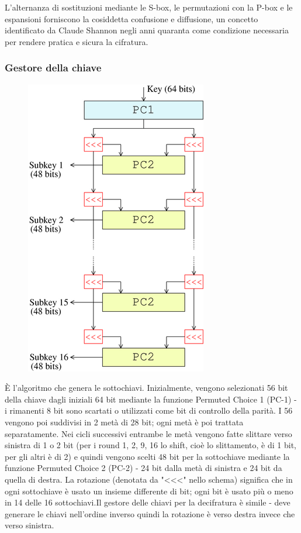 \documentclass[10pt,a4paper]{article}
\begin{document}
L'alternanza di sostituzioni mediante le S-box, le permutazioni con la P-box e le espansioni forniscono la cosiddetta confusione e diffusione, un concetto identificato da Claude Shannon negli anni quaranta come condizione necessaria per rendere pratica e sicura la cifratura.

\subsubsection{Gestore della chiave}

\begin{figure}[htbp]
\includegraphics[scale=0.6]{immagini/DES_gestore_chiave.png}
\end{figure}
È l'algoritmo che genera le sottochiavi. Inizialmente, vengono selezionati 56 bit della chiave dagli iniziali 64 bit mediante la funzione Permuted Choice 1 (PC-1) - i rimanenti 8 bit sono scartati o utilizzati come bit di controllo della parità. I 56 vengono poi suddivisi in 2 metà di 28 bit; ogni metà è poi trattata separatamente. Nei cicli successivi entrambe le metà vengono fatte slittare verso sinistra di 1 o 2 bit (per i round 1, 2, 9, 16 lo shift, cioè lo slittamento, è di 1 bit, per gli altri è di 2) e quindi vengono scelti 48 bit per la sottochiave mediante la funzione Permuted Choice 2 (PC-2) - 24 bit dalla metà di sinistra e 24 bit da quella di destra. La rotazione (denotata da "<<<" nello schema) significa che in ogni sottochiave è usato un insieme differente di bit; ogni bit è usato più o meno in 14 delle 16 sottochiavi.Il gestore delle chiavi per la decifratura è simile - deve generare le chiavi nell'ordine inverso quindi la rotazione è verso destra invece che verso sinistra.
\end{document}
